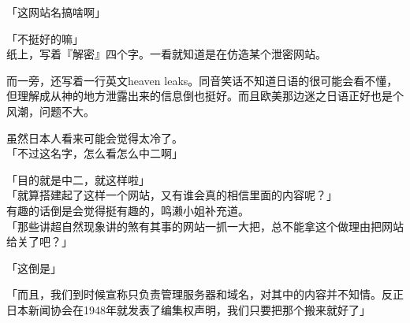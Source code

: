 「这网站名搞啥啊」

「不挺好的嘛」\\

纸上，写着『解密』四个字。一看就知道是在仿造某个泄密网站。

而一旁，还写着一行英文heaven leaks。同音笑话不知道日语的很可能会看不懂，但理解成从神的地方泄露出来的信息倒也挺好。而且欧美那边迷之日语正好也是个风潮，问题不大。

虽然日本人看来可能会觉得太冷了。\\

「不过这名字，怎么看怎么中二啊」

「目的就是中二，就这样啦」\\

「就算搭建起了这样一个网站，又有谁会真的相信里面的内容呢？」\\

有趣的话倒是会觉得挺有趣的，鸣濑小姐补充道。\\

「那些讲超自然现象讲的煞有其事的网站一抓一大把，总不能拿这个做理由把网站给关了吧？」

「这倒是」

「而且，我们到时候宣称只负责管理服务器和域名，对其中的内容并不知情。反正日本新闻协会在1948年就发表了编集权声明，我们只要把那个搬来就好了」\\

